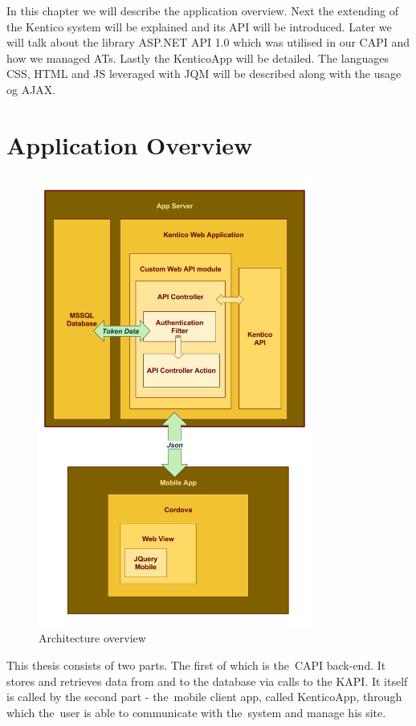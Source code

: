 In this chapter we will describe the application overview. Next the extending of the Kentico system will be explained and its API will be introduced. Later we will talk about the library ASP.NET API 1.0 which was utilised in our CAPI and how we managed ATs. Lastly the KenticoApp will be detailed. The languages CSS, HTML and JS leveraged with JQM will be described along with the usage og AJAX.
\section{Application Overview}
\begin{figure}[ht!]
  \centering
  \includegraphics[width=0.8\textwidth]{Images/Architecture.png}
  \caption{Architecture overview}
  \label{architectureOverview}
\end{figure}
This thesis consists of two parts. The first of which is the~CAPI back-end. It stores and retrieves data from and to the database via calls to the KAPI. It itself is called by the second part - the~mobile client app, called KenticoApp, through which the~user is able to communicate with the~system and manage his site.

